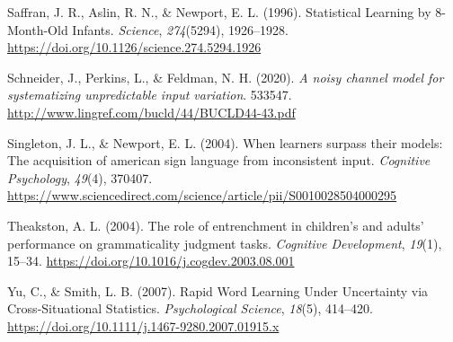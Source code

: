 \documentclass[10pt, letterpaper, hidelinks]{article}
\newenvironment{CSLReferences}%
  {}%
  {\par}
\begin{document}
\begin{CSLReferences}{1}{0}
\leavevmode{}%
Saffran, J. R., Aslin, R. N., \& Newport, E. L. (1996). Statistical
Learning by 8-Month-Old Infants. \emph{Science}, \emph{274}(5294),
1926--1928. \url{https://doi.org/10.1126/science.274.5294.1926}

\leavevmode{}%
Schneider, J., Perkins, L., \& Feldman, N. H. (2020). \emph{A noisy
channel model for systematizing unpredictable input variation}. 533547.
\url{http://www.lingref.com/bucld/44/BUCLD44-43.pdf}

\leavevmode{}%
Singleton, J. L., \& Newport, E. L. (2004). When learners surpass their
models: The acquisition of american sign language from inconsistent
input. \emph{Cognitive Psychology}, \emph{49}(4), 370407.
\url{https://www.sciencedirect.com/science/article/pii/S0010028504000295}

\leavevmode{}%
Theakston, A. L. (2004). The role of entrenchment in children{'}s and
adults{'} performance on grammaticality judgment tasks. \emph{Cognitive
Development}, \emph{19}(1), 15--34.
\url{https://doi.org/10.1016/j.cogdev.2003.08.001}

\leavevmode{}%
Yu, C., \& Smith, L. B. (2007). Rapid Word Learning Under Uncertainty
via Cross-Situational Statistics. \emph{Psychological Science},
\emph{18}(5), 414--420.
\url{https://doi.org/10.1111/j.1467-9280.2007.01915.x}

\end{CSLReferences}


\end{document}
